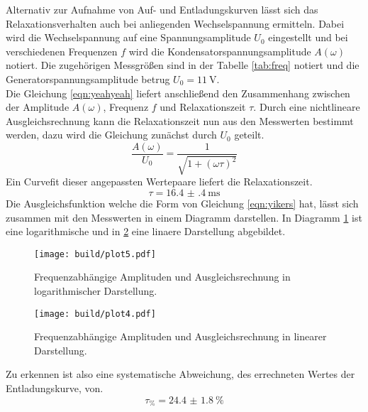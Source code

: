 Alternativ zur Aufnahme von Auf- und Entladungskurven lässt sich das Relaxationsverhalten auch bei anliegenden Wechselspannung ermitteln.
Dabei wird die Wechselspannung auf eine Spannungsamplitude $U_{0}$ eingestellt und bei verschiedenen Frequenzen $f$ wird die Kondensatorspannungsamplitude $A(\omega)$ notiert.
Die zugehörigen Messgrößen sind in der Tabelle \ref{tab:freq} notiert und die Generatorspannungsamplitude betrug $U_{0} = \SI{11}{\volt}$.
\\
Die Gleichung \eqref{eqn:yeahyeah} liefert anschließend den Zusammenhang zwischen der Amplitude $A(\omega)$, Frequenz $f$ und Relaxationszeit $\tau$.
Durch eine nichtlineare Ausgleichsrechnung kann die Relaxationszeit nun aus den Messwerten bestimmt werden, dazu wird die Gleichung zunächst durch $U_{0}$ geteilt.
\begin{equation}
    \label{eqn:yikers}
    \frac{A(\omega)}{U_{0}} = \frac{1}{\sqrt{1+(\omega \tau)^{2}}}
\end{equation}
Ein Curvefit dieser angepassten Wertepaare liefert die Relaxationszeit.
\begin{equation*}
\tau = \SI{16.4(4)}{\milli\second}
\end{equation*}
Die Ausgleichsfunktion welche die Form von Gleichung \eqref{eqn:yikers} hat, lässt sich zusammen mit den Messwerten in einem Diagramm darstellen. In Diagramm \ref{fig:plot5}
ist eine logarithmische und in \ref{fig:plot4} eine linaere Darstellung abgebildet. 
\begin{figure}
    \centering 
    \texttt{[image: build/plot5.pdf]}
    \caption{Frequenzabhängige Amplituden und Ausgleichsrechnung in logarithmischer Darstellung.}
    \label{fig:plot5}
\end{figure} 
\begin{figure}
    \centering 
    \texttt{[image: build/plot4.pdf]}
    \caption{Frequenzabhängige Amplituden und Ausgleichsrechnung in linearer Darstellung.}
    \label{fig:plot4}
\end{figure} 
Zu erkennen ist also eine systematische Abweichung, des errechneten Wertes der Entladungskurve, von.
\begin{equation}
\tau_{\si{\percent}} = \SI{24.4(18)}{\percent}
\end{equation}
